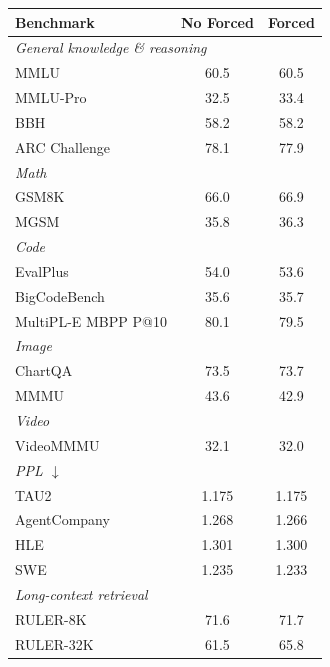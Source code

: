 \documentclass{llmxive}
\begin{document}
\begin{table}[!htb]
\begin{minipage}[t]{0.48\textwidth}
\centering
\small
\begin{tabular}{l c c}
\toprule
Benchmark & No Forced & Forced \\
\midrule
\multicolumn{3}{l}{\textit{General knowledge \& reasoning}} \\
MMLU                                & 60.5 & 60.5 \\
MMLU-Pro                            & 32.5 & 33.4 \\
BBH                                 & 58.2 & 58.2 \\
ARC Challenge                       & 78.1 & 77.9 \\
\midrule
\multicolumn{3}{l}{\textit{Math}} \\
GSM8K                               & 66.0 & 66.9 \\
MGSM                                & 35.8 & 36.3 \\
\midrule
\multicolumn{3}{l}{\textit{Code}} \\
EvalPlus                            & 54.0 & 53.6 \\
BigCodeBench                        & 35.6 & 35.7 \\
MultiPL-E MBPP P@10                 & 80.1 & 79.5 \\
\midrule
\multicolumn{3}{l}{\textit{Image}} \\
ChartQA                            & 73.5 & 73.7 \\
MMMU                               & 43.6 & 42.9 \\
\midrule
\multicolumn{3}{l}{\textit{Video}} \\
VideoMMMU                          & 32.1 & 32.0 \\
\midrule
\multicolumn{3}{l}{\textit{PPL $\downarrow$}} \\
TAU2                                & 1.175 & 1.175 \\
AgentCompany                        & 1.268 & 1.266 \\
HLE                                 & 1.301 & 1.300 \\
SWE                                 & 1.235 & 1.233 \\
\midrule
\multicolumn{3}{l}{\textit{Long-context retrieval}} \\
RULER-8K                             & 71.6 & 71.7 \\
RULER-32K                            & 61.5 & 65.8 \\

\end{tabular}
\end{minipage}
\end{table}
\end{document}
